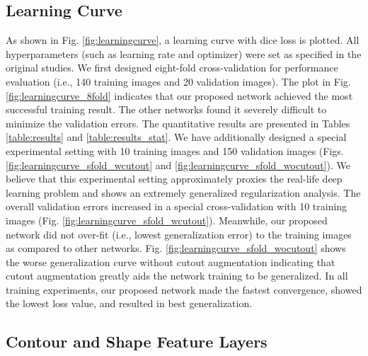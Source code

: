\documentclass[journal]{IEEEtran}
\begin{document}
        
        
        
        
    
        
        

\subsection{Learning Curve}
As shown in Fig. \ref{fig:learningcurve}, a learning curve with dice loss is plotted. All hyperparameters (such as learning rate and optimizer) were set as specified in the original studies. We first designed eight-fold cross-validation for performance evaluation (i.e., 140 training images and 20 validation images). The plot in Fig. \ref{fig:learningcurve_8fold} indicates that our proposed network achieved the most successful training result. The other networks found it severely difficult to minimize the validation errors. The quantitative results are presented in Tables \ref{table:results} and \ref{table:results_stat}. We have additionally designed a special experimental setting with 10 training images and 150 validation images (Figs. \ref{fig:learningcurve_sfold_wcutout} and \ref{fig:learningcurve_sfold_wocutout}). We believe that this experimental setting approximately proxies the real-life deep learning problem and shows an extremely generalized regularization analysis. The overall validation errors increased in a special cross-validation with 10 training images (Fig. \ref{fig:learningcurve_sfold_wcutout}). Meanwhile, our proposed network did not over-fit (i.e., lowest generalization error) to the training images as compared to other networks. Fig. \ref{fig:learningcurve_sfold_wocutout} shows the worse generalization curve without cutout augmentation \cite{devries2017improved} indicating that cutout augmentation greatly aids the network training to be generalized. In all training experiments, our proposed network made the fastest convergence, showed the lowest loss value, and resulted in best generalization.



        
        
        
        
        
        


\subsection{Contour and Shape Feature Layers}
\end{document}
